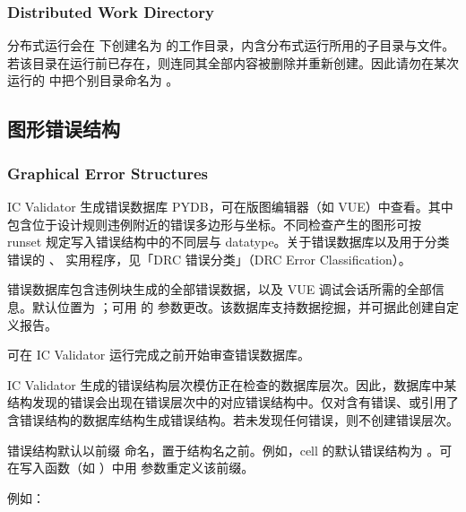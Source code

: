 \subsubsection*{Distributed Work Directory}

分布式运行会在  下创建名为  的工作目录，内含分布式运行所用的子目录与文件。若该目录在运行前已存在，则连同其全部内容被删除并重新创建。因此请勿在某次运行的  中把个别目录命名为 。

\subsection{图形错误结构}
\subsubsection*{Graphical Error Structures}

IC Validator 生成错误数据库 PYDB，可在版图编辑器（如 VUE）中查看。其中包含位于设计规则违例附近的错误多边形与坐标。不同检查产生的图形可按 runset 规定写入错误结构中的不同层与 datatype。关于错误数据库以及用于分类错误的 、 实用程序，见「DRC 错误分类」（DRC Error Classification）。

错误数据库包含违例块生成的全部错误数据，以及 VUE 调试会话所需的全部信息。默认位置为 ；可用  的  参数更改。该数据库支持数据挖掘，并可据此创建自定义报告。

\begin{noteBox}
可在 IC Validator 运行完成之前开始审查错误数据库。
\end{noteBox}

IC Validator 生成的错误结构层次模仿正在检查的数据库层次。因此，数据库中某结构发现的错误会出现在错误层次中的对应错误结构中。仅对含有错误、或引用了含错误结构的数据库结构生成错误结构。若未发现任何错误，则不创建错误层次。

错误结构默认以前缀  命名，置于结构名之前。例如，cell  的默认错误结构为 。可在写入函数（如 ）中用  参数重定义该前缀。

例如：

